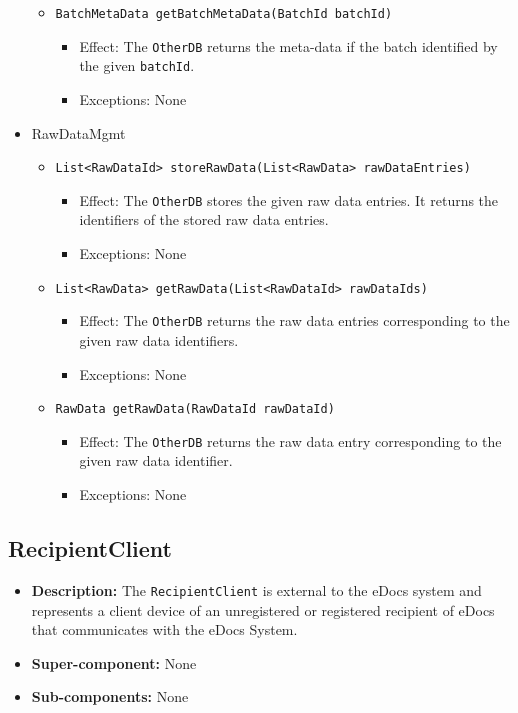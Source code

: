\documentclass[a4paper,10pt]{article}
\begin{document}
\begin{itemize}
\begin{itemize}
        \item \texttt{BatchMetaData getBatchMetaData(BatchId batchId)}
        \begin{itemize}
            \item Effect: The \texttt{OtherDB} returns the meta-data if the batch identified by the given \texttt{batchId}.
            \item Exceptions: None
        \end{itemize}
    \end{itemize}    
    
    	\item RawDataMgmt
    \begin{itemize}
        \item \texttt{List<RawDataId> storeRawData(List<RawData> rawDataEntries)}
        \begin{itemize}
            \item Effect: The \texttt{OtherDB} stores the given raw data entries. It returns the identifiers of the stored raw data entries.
            \item Exceptions: None
        \end{itemize}
        
        \item \texttt{List<RawData> getRawData(List<RawDataId> rawDataIds)}
        \begin{itemize}
            \item Effect: The \texttt{OtherDB} returns the raw data entries corresponding to the given raw data identifiers.
            \item Exceptions: None
        \end{itemize}
        
            \item \texttt{RawData getRawData(RawDataId rawDataId)}
        \begin{itemize}
            \item Effect: The \texttt{OtherDB} returns the raw data entry corresponding to the given raw data identifier.
            \item Exceptions: None
        \end{itemize}
    \end{itemize} 
    
\end{itemize}

\subsection{RecipientClient}
\begin{itemize}
    \item \textbf{Description:} The \texttt{RecipientClient} is external to the eDocs system and represents a client device of an unregistered or registered recipient of eDocs that communicates with the eDocs System.
    \item \textbf{Super-component:} None
    \item \textbf{Sub-components:} None
\end{itemize}
\end{document}
